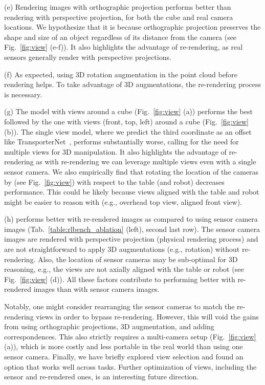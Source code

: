  (e) Rendering images with orthographic projection performs better than rendering with perspective projection, for both the cube and real camera locations. We hypothesize that it is because orthographic projection preserves the shape and size of an object regardless of its distance from the camera (see Fig.~\ref{fig:view} (e-f)). It also highlights the advantage of re-rendering, as real sensors generally render with perspective projections.

(f) As expected, using 3D rotation augmentation in the point cloud before rendering helps. To take advantage of 3D augmentations, the re-rendering process is necessary. 

(g) The model with  views around a cube (Fig.~\ref{fig:view} (a)) performs the best followed by the one with  views (front, top, left) around a cube (Fig.~\ref{fig:view} (b)). The single view model, where we predict the third coordinate as an offset like TransporterNet~\cite{transporter2021}, performs substantially worse, calling for the need for multiple views for 3D manipulation. It also highlights the advantage of re-rendering as with re-rendering we can leverage multiple views even with a single sensor camera. We also empirically find that rotating the location of the cameras by  (see Fig.~\ref{fig:view}) with respect to the table (and robot) decreases performance. This could be likely because views aligned with the table and robot might be easier to reason with (e.g., overhead top view, aligned front view).

(h) \method performs better with re-rendered images as compared to using sensor camera images (Tab.~\ref{table:rlbench_ablation} (left), second last row). The sensor camera images are rendered with perspective projection (physical rendering process) and are not straightforward to apply 3D augmentations (e.g., rotation) without re-rendering. Also, the location of sensor cameras may be sub-optimal for 3D reasoning, e.g., the views are not axially aligned with the table or robot (see Fig.~\ref{fig:view} (d)). All these factors contribute to \method performing better with re-rendered images than with sensor camera images. 

Notably, one might consider rearranging the sensor cameras to match the re-rendering views in order to bypass re-rendering. However, this will void the gains from using orthographic projections, 3D augmentation, and adding correspondences. This also strictly requires a multi-camera setup (Fig.~\ref{fig:view} (a)), which is more costly and less portable in the real world than using one sensor camera. Finally, we have briefly explored view selection and found an option that works well across tasks. Further optimization of views, including the sensor and re-rendered ones, is an interesting future direction.

